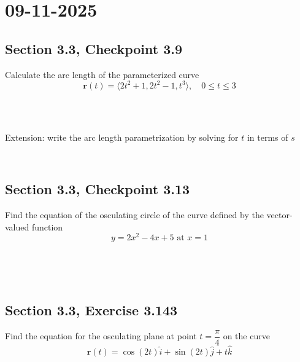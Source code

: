 \documentclass[]{mangos-musings}
\begin{document}
\newpage
\section{09-11-2025}
\subsection{Section 3.3, Checkpoint 3.9}
Calculate the arc length of the parameterized curve
\[\mathbf{r}(t) = \langle 2t^2 + 1, 2t^2 - 1, t^3 \rangle, \quad 0 \le t \le 3\]
\begin{align*}
  \\ \\ \\ \\ \\ \\ \\ \\ \\ \\
\end{align*}
Extension: write the arc length parametrization by solving for $t$ in terms of $s$
\begin{align*}
  \\ \\ \\ \\
\end{align*}

\newpage
\subsection{Section 3.3, Checkpoint 3.13}
Find the equation of the osculating circle of the curve defined by the vector-valued function 
\[y = 2x^2 - 4x + 5 \text{ at } x = 1\]
\begin{align*}
  \\ \\ \\ \\ \\ \\ \\ \\ \\ \\
\end{align*}

\subsection{Section 3.3, Exercise 3.143}
Find the equation for the osculating plane at point $t = \dfrac{\pi}{4}$ on the curve 
\[\mathbf{r}(t) = \cos(2t) \hat{i} + \sin(2t)\hat{j} + t\hat{k}\]
\end{document}
